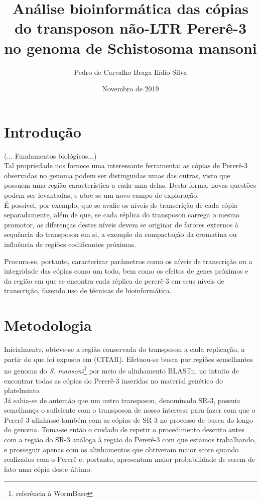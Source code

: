 \documentclass[12pt]{article}
\title{Análise bioinformática das cópias do transposon não-LTR Pererê-3 no genoma de Schistosoma mansoni}
\author{Pedro de Carvalho Braga Ilídio Silva}
\date{Novembro de 2019}
\begin{document}
\maketitle

\begin{multicols}{2}
\section{Introdução}
	(... Fundamentos biológicos...)\\
Tal propriedade nos fornece uma interessante ferramenta: as cópias de Pererê-3 observadas no genoma podem ser distinguidas umas das outras, visto que possuem uma região característica a cada uma delas. Desta forma, novas questões podem ser levantadas, e abre-se um novo campo de exploração.\\

É possível, por exemplo, que se avalie os níveis de transcrição de cada cópia separadamente, além de que, se cada réplica do transposon carrega o mesmo promotor, as diferenças destes níveis devem se originar de fatores externos à sequência do transposon em si, a exemplo da compactação da cromatina ou influência de regiões codificantes próximas.%

Procura-se, portanto, caracterizar parâmetros como os níveis de transcrição ou a integridade das cópias como um todo, bem como os efeitos de genes próximos e da região em que se encontra cada réplica de pererê-3 em seus níveis de transcrição, fazendo uso de técnicas de bioinformática.

\section{Metodologia}
	Inicialmente, obteve-se a região conservada do transposon a cada replicação, a partir do que foi exposto em (CITAR). Efetuou-se busca por regiões semelhantes no genoma do \textit{S. mansoni}\footnote{referência à WormBase} por meio de alinhamento BLASTn, no intuito de encontrar todas as cópias do Pererê-3 inseridas no material genético do platelminto.\\

	Já sabia-se de antemão que um outro transposon, denominado SR-3, possuia semelhança o suficiente com o transposon de nosso interesse para fazer com que o Pererê-3 alinhasse também com as cópias de SR-3 no processo de busca do longo do genoma. Toma-se então o cuidado de repetir o procedimento descrito antes com a região do SR-3 análoga à região do Pererê-3 com que estamos trabalhando, e prosseguir apenas com os alinhamentos que obtiveram maior score quando realizados com o Pererê e, portanto, apresentam maior probabilidade de serem de fato uma cópia deste último.\\


\end{multicols}
\end{document}
